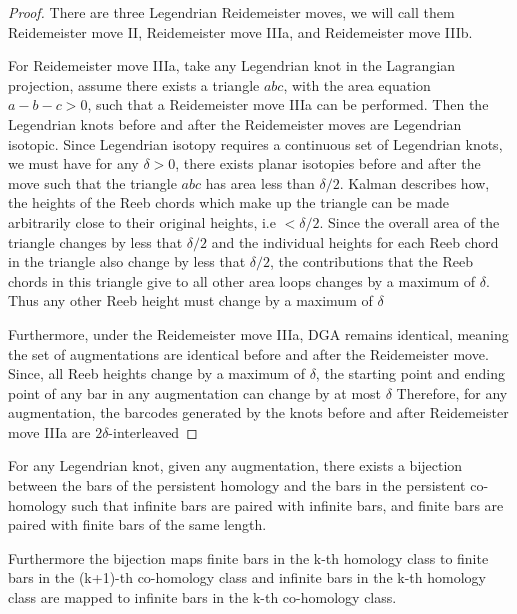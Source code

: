 \documentclass[11pt,oneside]{amsart}
\begin{document}
\begin{proof}

There are three Legendrian Reidemeister moves, we will call them Reidemeister move II, Reidemeister move IIIa, and Reidemeister move IIIb.

For Reidemeister move IIIa, take any Legendrian knot in the Lagrangian projection, assume there exists a triangle $abc$, with the area equation $a-b-c > 0$, such that a Reidemeister move IIIa can be performed. Then the Legendrian knots before and after the Reidemeister moves are Legendrian isotopic. Since Legendrian isotopy requires a continuous set of Legendrian knots, we must have for any $\delta > 0$, there exists planar isotopies before and after the move such that the triangle $abc$ has area less than $\delta/2$. Kalman describes how, the heights of the Reeb chords which make up the triangle can be made arbitrarily close to their original heights, i.e $< \delta/2$. Since the overall area of the triangle changes by less that $\delta/2$ and the individual heights for each Reeb chord in the triangle also change by less that $\delta/2$, the contributions that the Reeb chords in this triangle give to all other area loops changes by a maximum of $\delta$. Thus any other Reeb height must change by a maximum of $\delta$

Furthermore, under the Reidemeister move IIIa, DGA remains identical, meaning the set of augmentations are identical before and after the Reidemeister move. Since, all Reeb heights change by a maximum of $\delta$, the starting point and ending point of any bar in any augmentation can change by at most $\delta$ Therefore, for any augmentation, the barcodes generated by the knots before and after Reidemeister move IIIa are $2\delta$-interleaved 
    
\end{proof}

\begin{theorem}

For any Legendrian knot, given any augmentation, there exists a bijection between the bars of the persistent homology and the bars in the persistent co-homology such that infinite bars are paired with infinite bars, and finite bars are paired with finite bars of the same length.

Furthermore the bijection maps finite bars in the k-th homology class to finite bars in the (k+1)-th co-homology class and infinite bars in the k-th homology class are mapped to infinite bars in the k-th co-homology class.

\end{theorem}
\end{document}
